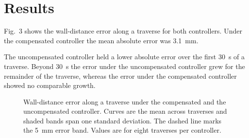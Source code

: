 \section{Results}

Fig.~3 shows the wall-distance error along a traverse for both controllers. Under the
compensated controller the mean absolute error was 3.1~mm.

The uncompensated controller held a lower absolute error over the first 30~s of a
traverse. Beyond 30~s the error under the uncompensated controller grew for the
remainder of the traverse, whereas the error under the compensated controller showed no
comparable growth.

\begin{figure}
\caption{Wall-distance error along a traverse under the compensated and the
uncompensated controller. Curves are the mean across traverses and shaded bands span
one standard deviation. The dashed line marks the 5~mm error band. Values are for eight
traverses per controller.}
\end{figure}

%
%
%

